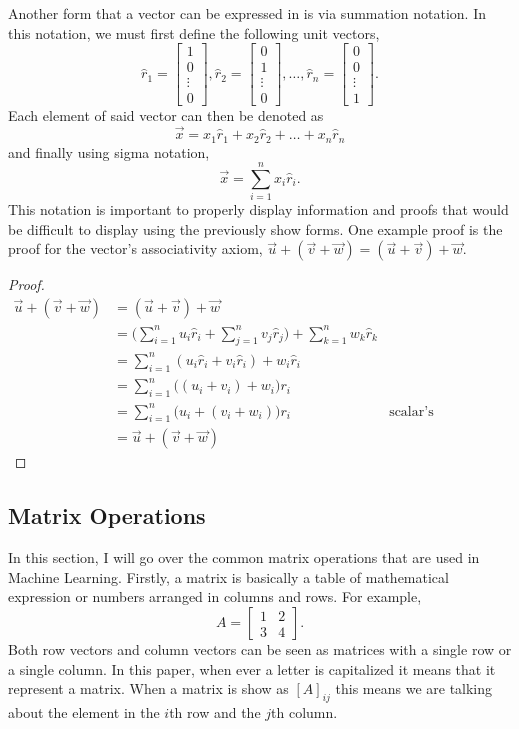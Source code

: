 \documentclass{article}
\begin{document}
Another form that a vector can be expressed in is via summation notation. In this notation, we must first define the following unit vectors, $$\hat{r}_1=\begin{bmatrix}1 \\ 0 \\ \vdots \\ 0\end{bmatrix},\hat{r}_2=\begin{bmatrix}0 \\ 1 \\ \vdots \\ 0\end{bmatrix},\dots,\hat{r}_n=\begin{bmatrix}0 \\ 0 \\ \vdots \\ 1\end{bmatrix} .$$ Each element of said vector can then be denoted as $$\vec{x}=x_1 \hat{r}_1 + x_2 \hat{r}_2 + \dots + x_n \hat{r}_n$$ and finally using sigma notation, $$\vec{x}=\sum_{i=1}^n x_i \hat{r}_i.$$ This notation is important to properly display information and proofs that would be difficult to display using the previously show forms. One example proof is the proof for the vector's associativity axiom, $\vec{u}+(\vec{v}+\vec{w})=(\vec{u}+\vec{v})+\vec{w}$.
\begin{proof}
\begin{align*}
\vec{u}+(\vec{v}+\vec{w})&=(\vec{u}+\vec{v})+\vec{w} \\
&=\bigg(\sum_{i=1}^nu_i \hat{r}_i+\sum_{j=1}^n v_j \hat{r}_j\bigg)+\sum_{k=1}^n w_k \hat{r}_k\\
&=\sum_{i=1}^n (u_i\hat{r}_i + v_i\hat{r}_i) + w_i\hat{r}_i\\
&=\sum_{i=1}^n \big((u_i + v_i) + w_i\big)r_i\\
&=\sum_{i=1}^n \big(u_i+(v_i+w_i)\big)r_i&\text{scalar's associativity}\\
&=\vec{u}+(\vec{v}+\vec{w})
\end{align*}
\end{proof}

\subsection{Matrix Operations}

In this section, I will go over the common matrix operations that are used in Machine Learning. Firstly, a matrix is basically a table of mathematical expression or numbers arranged in columns and rows. For example, $$A=\begin{bmatrix} 1 & 2 \\ 3 & 4 \end{bmatrix}.$$ Both row vectors and column vectors can be seen as matrices with a single row or a single column. In this paper, when ever a letter is capitalized it means that it represent a matrix. When a matrix is show as $[A]_{ij}$ this means we are talking about the element in the $i$th row and the $j$th column.
\end{document}
